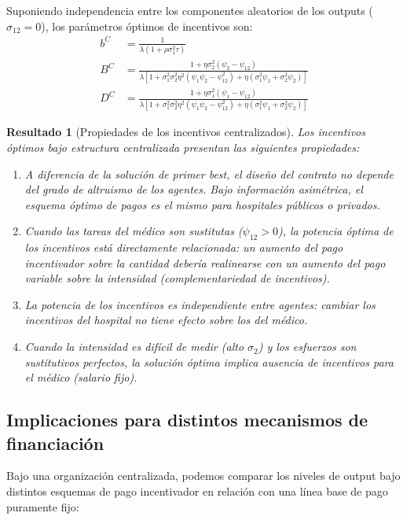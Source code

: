 \documentclass[12pt, a4paper, twoside, openright]{book}
\theoremstyle{plain}
\newtheorem{result}{Resultado}[chapter]
\theoremstyle{definition}
\theoremstyle{remark}
\begin{document}
Suponiendo independencia entre los componentes aleatorios de los outputs ($\sigma_{12}=0$), los parámetros óptimos de incentivos son:
\begin{align}
  b^C &= \frac{1}{\lambda(1+\rho\sigma_1^2\tau)} \label{eq:b_sb}\\
  B^C &= \frac{1+\eta\sigma_2^2(\psi_2-\psi_{12})}{\lambda[1+\sigma_1^2\sigma_2^2\eta^2(\psi_1\psi_2-\psi_{12}^2)+\eta(\sigma_1^2\psi_1+\sigma_2^2\psi_2)]} \label{eq:B_sb}\\
  D^C &= \frac{1+\eta\sigma_1^2(\psi_1-\psi_{12})}{\lambda[1+\sigma_1^2\sigma_2^2\eta^2(\psi_1\psi_2-\psi_{12}^2)+\eta(\sigma_1^2\psi_1+\sigma_2^2\psi_2)]} \label{eq:D_sb}
\end{align}

\begin{result}[Propiedades de los incentivos centralizados]
\label{res:incentivos_centralizados}
Los incentivos óptimos bajo estructura centralizada presentan las siguientes propiedades:
\begin{enumerate}[label=(\alph*)]
  \item A diferencia de la solución de primer \textit{best}, el diseño del contrato no depende del grado de altruismo de los agentes. Bajo información asimétrica, el esquema óptimo de pagos es el mismo para hospitales públicos o privados.
  \item Cuando las tareas del médico son sustitutas ($\psi_{12}>0$), la potencia óptima de los incentivos está directamente relacionada: un aumento del pago incentivador sobre la cantidad debería realinearse con un aumento del pago variable sobre la intensidad (\textit{complementariedad de incentivos}).
  \item La potencia de los incentivos es independiente entre agentes: cambiar los incentivos del hospital no tiene efecto sobre los del médico.
  \item Cuando la intensidad es difícil de medir (alto $\sigma_2$) y los esfuerzos son sustitutivos perfectos, la solución óptima implica ausencia de incentivos para el médico (salario fijo).
\end{enumerate}
\end{result}

\subsection{Implicaciones para distintos mecanismos de financiación}

Bajo una organización centralizada, podemos comparar los niveles de output bajo distintos esquemas de pago incentivador en relación con una línea base de pago puramente fijo:
\end{document}
